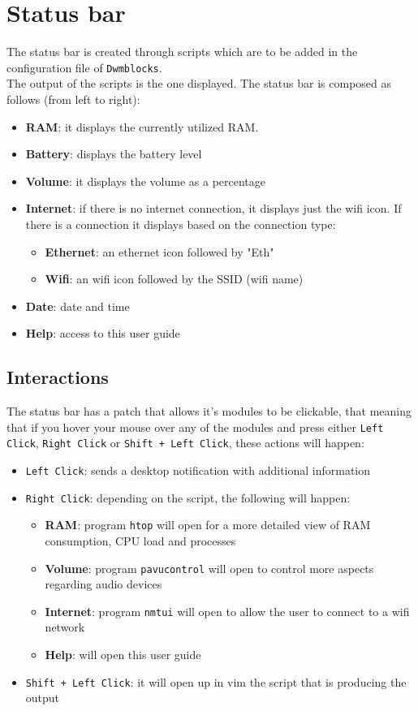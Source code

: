 \documentclass[11pt]{article}
\begin{document}
\section{Status bar}

The status bar is created through scripts which are to be added in the configuration file of \texttt{Dwmblocks}.\\
The output of the scripts is the one displayed. The status bar is composed as
follows (from left to right):
\begin{itemize}
	\item \textbf{RAM}: it displays the currently utilized RAM. 
	\item \textbf{Battery}: displays the battery level 
	\item \textbf{Volume}: it displays the volume as a percentage 
	\item \textbf{Internet}: if there is no internet connection,
	it displays just the wifi icon. If there is a connection it displays based on the connection type: 
	\begin{itemize}
		\item \textbf{Ethernet}: an ethernet icon followed by "Eth"
		\item \textbf{Wifi}: an wifi icon followed by the SSID (wifi name)
	\end{itemize}
	\item \textbf{Date}: date and time
	\item \textbf{Help}: access to this user guide
\end{itemize}

\subsection{Interactions}

The status bar has a patch that allows it's modules to be clickable, that
meaning that if you hover your mouse over any of the modules and press either
\texttt{Left Click}, \texttt{Right Click} or \texttt{Shift + Left Click}, these
actions will happen:
\begin{itemize}
	\item \texttt{Left Click}: sends a desktop notification with additional
	information 
	\item \texttt{Right Click}: depending on the script, the following will 
	happen:
	\begin{itemize}
		\item \textbf{RAM}: program \texttt{htop} will open for a more
		detailed view of RAM consumption, CPU load and processes
		\item \textbf{Volume}: program \texttt{pavucontrol} will open to
		control more aspects regarding audio devices
		\item \textbf{Internet}: program \texttt{nmtui} will open to allow
		the user to connect to a wifi network
		\item \textbf{Help}: will open this user guide
	\end{itemize}
	\item \texttt{Shift + Left Click}: it will open up in vim the script that
	is producing the output
\end{itemize}
\end{document}
